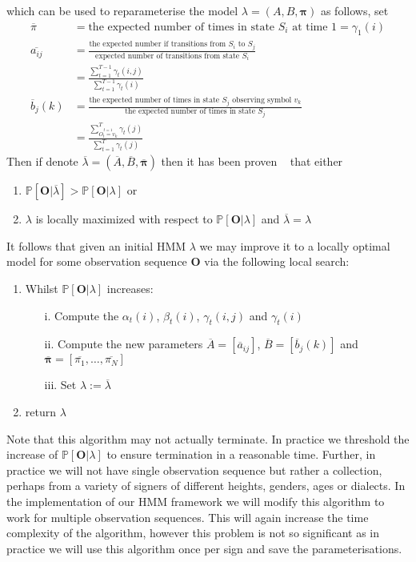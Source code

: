 which can be used to reparameterise the model $\lambda = (A,B,\bm{\pi})$ as follows, set
\begin{align*}
\overline{\pi} &= \text{the expected number of times in state $S_i$ at time $1$} = \gamma_1(i) \\
\overline{a_{ij}} &= \frac{\text{the expected number if transitions from $S_i$ to $S_j$}}{\text{expected number of transitions from state $S_i$}} \\ 
				&= \frac{\sum_{t=1}^{T-1} \gamma_t(i,j)}{\sum_{t=1}^{T-1} \gamma_t(i)} \\
\overline{b}_j(k) &= \frac{\text{the expected number of times in state $S_j$ observing symbol $v_k$}}{\text{the expected number of times in state $S_j$}} \\
				&=\frac{\sum_{\stackrel{t=1}{O_t=v_k}}^{T}\gamma_t(j)}{\sum_{t=1}^T \gamma_t(j)}
\end{align*}
Then if denote $\overline{\lambda} = (\overline{A},\overline{B},\overline{\bm{\pi}})$ then it has been proven ~\citep{levinson1983introduction, baum1968growth} that either
\begin{enumerate}
\item $\mathbb{P}[\bm{O}|\overline{\lambda}] > \mathbb{P}[\bm{O}|\lambda]$ or
\item $\lambda$ is locally maximized with respect to $\mathbb{P}[\bm{O}|\lambda]$ and $\overline{\lambda} = \lambda$
\end{enumerate}
It follows that given an initial HMM $\lambda$ we may improve it to a locally optimal model for some observation sequence $\bm{O}$ via the following local search:
\begin{enumerate}
\item Whilst $\mathbb{P}[\bm{O}|\lambda]$ increases:
	\begin{enumerate}
		\item[i.] Compute the $\alpha_t(i)$, $\beta_t(i)$, $\gamma_t(i,j)$ and $\gamma_t(i)$
		\item[ii.] Compute the new parameters $\overline{A} = [\overline{a}_{ij}]$, $\overline{B} = [\overline{b}_j(k)]$ and $\overline{\bm{\pi}} = [\overline{\pi_1}, \dots, \overline{\pi_N}]$
		\item[iii.] Set $\lambda := \overline{\lambda}$
	\end{enumerate}
\item return $\lambda$
\end{enumerate}
Note that this algorithm may not actually terminate. In practice we threshold the increase of $\mathbb{P}[\bm{O}|\lambda]$ to ensure termination in a reasonable time. Further, in practice we will not have single observation sequence but rather a collection, perhaps from a variety of signers of different heights, genders, ages or dialects. In the implementation of our HMM framework we will modify this algorithm to work for multiple observation sequences. This will again increase the time complexity of the algorithm, however this problem is not so significant as in practice we will use this algorithm once per sign and save the parameterisations.

